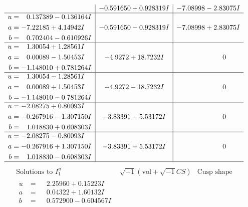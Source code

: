 \documentclass[1p]{elsarticle_modified}
\theoremstyle{definition}
\newcommand{\I}{\sqrt{-1}}
\begin{document}
$$\begin{array}{c|c|c}
 & -0.591650 + 0.928319 I & -7.08998 - 2.83075 I \\ \hline\begin{aligned}
u &= \phantom{-}0.137389 - 0.136164 I \\
a &= -7.22185 + 4.14942 I \\
b &= \phantom{-}0.702404 - 0.610926 I\end{aligned}
 & -0.591650 - 0.928319 I & -7.08998 + 2.83075 I \\ \hline\begin{aligned}
u &= \phantom{-}1.30054 + 1.28561 I \\
a &= \phantom{-}0.00089 - 1.50453 I \\
b &= -1.148010 + 0.781264 I\end{aligned}
 & -4.9272 + 18.7232 I & \phantom{-0.000000 } 0 \\ \hline\begin{aligned}
u &= \phantom{-}1.30054 - 1.28561 I \\
a &= \phantom{-}0.00089 + 1.50453 I \\
b &= -1.148010 - 0.781264 I\end{aligned}
 & -4.9272 - 18.7232 I & \phantom{-0.000000 } 0 \\ \hline\begin{aligned}
u &= -2.08275 + 0.80093 I \\
a &= -0.267916 - 1.307150 I \\
b &= \phantom{-}1.018830 + 0.608303 I\end{aligned}
 & -3.83391 - 5.53172 I & \phantom{-0.000000 } 0 \\ \hline\begin{aligned}
u &= -2.08275 - 0.80093 I \\
a &= -0.267916 + 1.307150 I \\
b &= \phantom{-}1.018830 - 0.608303 I\end{aligned}
 & -3.83391 + 5.53172 I & \phantom{-0.000000 } 0\\
 \hline 
 \end{array}$$\newpage$$\begin{array}{c|c|c}  
\text{Solutions to }I^u_{1}& \I (\text{vol} + \sqrt{-1}CS) & \text{Cusp shape}\\
 \hline 
\begin{aligned}
u &= \phantom{-}2.25960 + 0.15223 I \\
a &= \phantom{-}0.04322 + 1.60132 I \\
b &= \phantom{-}0.572900 - 0.604567 I\end{aligned}

\end{array}$$
\end{document}

